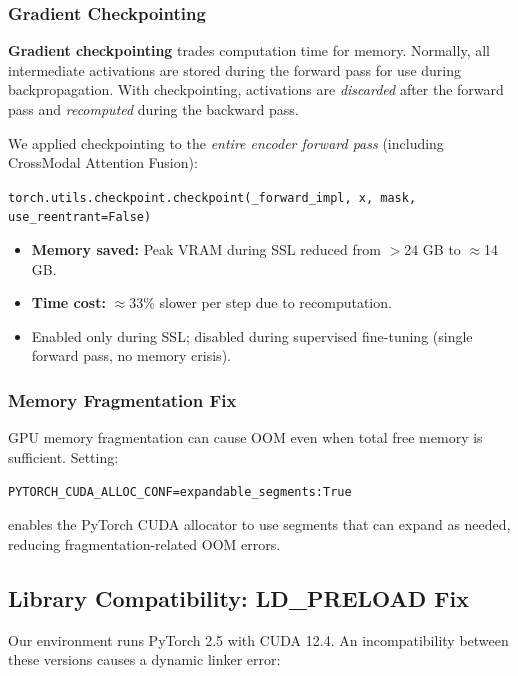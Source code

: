 \documentclass[12pt,a4paper]{article}
\newcommand{\term}[1]{\textbf{\textcolor{mainblue}{#1}}}
\newcommand{\code}[1]{\texttt{\small #1}}
\begin{document}
\subsubsection{Gradient Checkpointing}

\term{Gradient checkpointing} trades computation time for memory. Normally, all intermediate activations are stored during the forward pass for use during backpropagation. With checkpointing, activations are \emph{discarded} after the forward pass and \emph{recomputed} during the backward pass.

We applied checkpointing to the \emph{entire encoder forward pass} (including CrossModal Attention Fusion):

\begin{center}
\code{torch.utils.checkpoint.checkpoint(\_forward\_impl, x, mask, use\_reentrant=False)}
\end{center}

\begin{itemize}[noitemsep]
  \item \textbf{Memory saved:} Peak VRAM during SSL reduced from $>$24 GB to $\approx$14 GB.
  \item \textbf{Time cost:} $\approx$33\% slower per step due to recomputation.
  \item Enabled only during SSL; disabled during supervised fine-tuning (single forward pass, no memory crisis).
\end{itemize}

\subsubsection{Memory Fragmentation Fix}

GPU memory fragmentation can cause OOM even when total free memory is sufficient. Setting:

\begin{center}
\code{PYTORCH\_CUDA\_ALLOC\_CONF=expandable\_segments:True}
\end{center}

enables the PyTorch CUDA allocator to use segments that can expand as needed, reducing fragmentation-related OOM errors.

\subsection{Library Compatibility: LD\_PRELOAD Fix}

Our environment runs PyTorch 2.5 with CUDA 12.4. An incompatibility between these versions causes a dynamic linker error:
\end{document}
